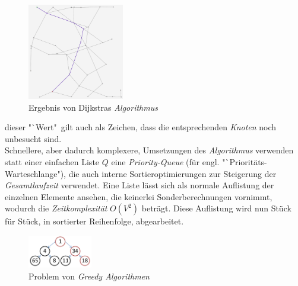 \documentclass[12pt]{article}
\begin{document}
\begin{figure}
\vspace{-20pt}
\begin{center}
\includegraphics[width=0.375\textwidth]{res/dijkV2.png}
\end{center}
\vspace{-30pt}
\centering
\caption{Ergebnis von Dijkstras \textit{Algorithmus}}
\label{fig:dijk}
\end{figure}

\noindent dieser "`Wert"\ gilt auch als Zeichen, dass die entsprechenden \textit{Knoten} noch unbesucht sind.
\\
Schnellere, aber dadurch komplexere, Umsetzungen des \textit{Algorithmus} verwenden statt einer einfachen Liste $Q$ eine \textit{Priority-Queue} (für engl. "`Prioritäts-Warteschlange"), die auch interne Sortieroptimierungen zur Steigerung der \textit{Gesamtlaufzeit} verwendet. Eine Liste lässt sich als normale Auflistung der einzelnen Elemente ansehen, die keinerlei Sonderberechnungen vornimmt, wodurch die \textit{Zeitkomplexität} $O(V^2)$ beträgt. Diese Auflistung wird nun Stück für Stück, in sortierter Reihenfolge, abgearbeitet. 
\begin{figure}
\vspace{-20pt}
\begin{center}
\includegraphics[width=0.25\textwidth]{res/greed.png}
\end{center}
\vspace{-30pt}
\centering
\caption{Problem von \textit{Greedy Algorithmen}}
\label{fig:greed}
\end{figure}
\end{document}
